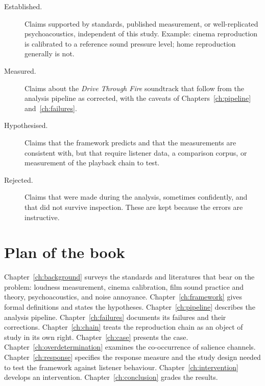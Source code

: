 \begin{description}
\item[Established.] Claims supported by standards, published measurement, or well-replicated psychoacoustics, independent of this study. Example: cinema reproduction is calibrated to a reference sound pressure level; home reproduction generally is not.
\item[Measured.] Claims about the \emph{Drive Through Fire} soundtrack that follow from the analysis pipeline as corrected, with the caveats of Chapters~\ref{ch:pipeline} and~\ref{ch:failures}.
\item[Hypothesised.] Claims that the framework predicts and that the measurements are consistent with, but that require listener data, a comparison corpus, or measurement of the playback chain to test.
\item[Rejected.] Claims that were made during the analysis, sometimes confidently, and that did not survive inspection. These are kept because the errors are instructive.
\end{description}

\section{Plan of the book}

Chapter~\ref{ch:background} surveys the standards and literatures that bear on the problem: loudness measurement, cinema calibration, film sound practice and theory, psychoacoustics, and noise annoyance. Chapter~\ref{ch:framework} gives formal definitions and states the hypotheses. Chapter~\ref{ch:pipeline} describes the analysis pipeline. Chapter~\ref{ch:failures} documents its failures and their corrections. Chapter~\ref{ch:chain} treats the reproduction chain as an object of study in its own right. Chapter~\ref{ch:case} presents the case. Chapter~\ref{ch:overdetermination} examines the co-occurrence of salience channels. Chapter~\ref{ch:response} specifies the response measure and the study design needed to test the framework against listener behaviour. Chapter~\ref{ch:intervention} develops an intervention. Chapter~\ref{ch:conclusion} grades the results.
